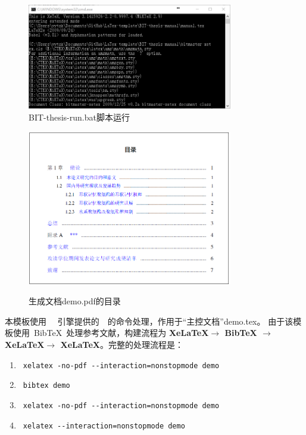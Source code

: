 \begin{figure}[!htp]
  \centering
  \includegraphics[width=0.8\textwidth]{figures/BIT-thesis-run}
  \caption{BIT-thesis-run.bat脚本运行}
  \label{fig:run}
\end{figure}


\begin{figure}[!htp]
  \centering
  {\includegraphics[width=0.8\textwidth]{figures/demo_context}}
  \caption{生成文档demo.pdf的目录}
  \label{fig:demo_context}
\end{figure}

本模板使用~\XeTeX~ 引擎提供的~\XeLaTeX~的命令处理，作用于“主控文档”demo.tex。
由于该模板使用~{{\sc Bib}\TeX}~处理参考文献，构建流程为 \textbf{XeLaTeX$\rightarrow$ BibTeX $\rightarrow$ XeLaTeX$\rightarrow$ XeLaTeX}。完整的处理流程是：

{\color{blue}
\begin{enumerate}
\item[] ~\verb|xelatex -no-pdf --interaction=nonstopmode demo|
\item[] ~\verb|bibtex demo| 
\item[] ~\verb|xelatex -no-pdf --interaction=nonstopmode demo|
\item[] ~\verb|xelatex --interaction=nonstopmode demo|
\end{enumerate}}

